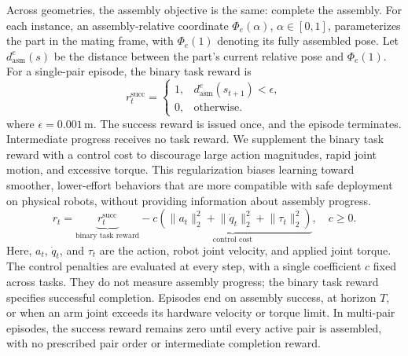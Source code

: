 Across geometries, the assembly objective is the same: complete the assembly.
For each instance, an assembly-relative coordinate $\Phi_e(\alpha)$,
$\alpha\in[0,1]$, parameterizes the part in the mating frame, with
$\Phi_e(1)$ denoting its fully assembled pose. Let $d_{\mathrm{asm}}^e(s)$ be
the distance between the part's current relative pose and $\Phi_e(1)$.
For a single-pair episode, the binary task reward is
\begin{equation}
    r_t^{\mathrm{succ}}
    =
    \begin{cases}
        1, & d_{\mathrm{asm}}^e(s_{t+1})<\epsilon,\\
        0, & \text{otherwise}.
    \end{cases}
    \label{eq:sparse-reward}
\end{equation}
where $\epsilon=0.001\,\mathrm{m}$.
The success reward is issued once, and the episode terminates.
Intermediate progress receives no task reward.
We supplement the binary task reward with a control cost to discourage
large action magnitudes, rapid joint motion, and excessive torque.
This regularization biases learning toward smoother, lower-effort behaviors that are more compatible with safe deployment on physical robots, without providing information about assembly progress.
\begin{equation}
    r_t = \underbrace{r_t^{\mathrm{succ}}}_{\text{binary task reward}} - \underbrace{c\left(\lVert a_t\rVert_2^2 + \lVert \dot{q}_t\rVert_2^2 + \lVert \tau_t\rVert_2^2\right)}_{\text{control cost}}, \quad c \geq 0.
    \label{eq:full-reward}
\end{equation}
Here, $a_t$, $\dot{q}_t$, and $\tau_t$ are the action, robot joint velocity, and
applied joint torque. The control penalties are evaluated at every step,
with a single coefficient $c$ fixed across tasks. They do not measure
assembly progress; the binary task reward specifies successful completion.
Episodes end on assembly success, at horizon $T$, or when an arm joint
exceeds its hardware velocity or torque limit. %
In multi-pair episodes, the success reward remains zero until every active pair is
assembled, with no prescribed pair order or intermediate completion
reward.



